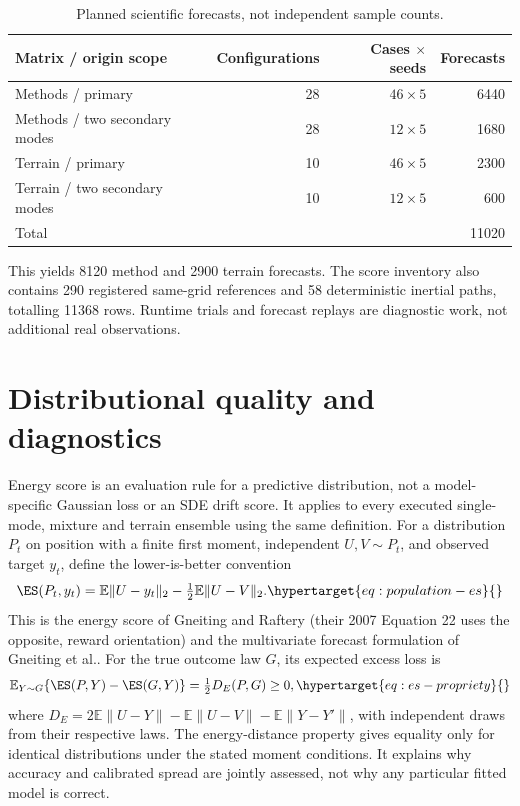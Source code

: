 \begin{table}[htbp]
\centering\small
\caption{Planned scientific forecasts, not independent sample counts.}
\label{tab:forecast-counts}\hypertarget{tab:forecast-counts}{}
\begin{tabular}{@{}lrrr@{}}
\toprule
Matrix / origin scope & Configurations & Cases $\times$ seeds & Forecasts\\
\midrule
Methods / primary & 28 & $46\times5$ & 6440\\
Methods / two secondary modes & 28 & $12\times5$ & 1680\\
Terrain / primary & 10 & $46\times5$ & 2300\\
Terrain / two secondary modes & 10 & $12\times5$ & 600\\
\midrule
Total & & & 11020\\
\bottomrule
\end{tabular}
\end{table}

This yields 8120 method and 2900 terrain forecasts. The score inventory also
contains 290 registered same-grid references and 58 deterministic inertial
paths, totalling 11368 rows. Runtime trials and forecast replays are diagnostic
work, not additional real observations.

\label{sec:inference}\hypertarget{sec:inference}{}

\section{Distributional quality and diagnostics}
Energy score is an evaluation rule for a predictive distribution, not a
model-specific Gaussian loss or an SDE drift score. It applies to every
executed single-mode, mixture and terrain ensemble using the same definition.
For a distribution \(P_t\) on position with a finite first moment,
independent \(U,V\sim P_t\), and observed target \(y_t\), define the
lower-is-better convention
\begin{equation}
 \ES(P_t,y_t)=\mathbb E\|U-y_t\|_2-\tfrac12\mathbb E\|U-V\|_2 .
 \label{eq:population-es}\hypertarget{eq:population-es}{}
\end{equation}
This is the energy score of Gneiting and Raftery (their 2007
Equation 22 uses the opposite, reward orientation) and the multivariate
forecast formulation of Gneiting et al.\cite{gneiting2007,gneiting2008}.
For the true outcome law \(G\), its expected excess loss is
\begin{equation}
 \mathbb E_{Y\sim G}\{\ES(P,Y)-\ES(G,Y)\}
 =\tfrac12 D_E(P,G)\geq0 ,
 \label{eq:es-propriety}\hypertarget{eq:es-propriety}{}
\end{equation}
where \(D_E=2\mathbb E\|U-Y\|-\mathbb E\|U-V\|-\mathbb E\|Y-Y'\|\),
with independent draws from their respective laws. The energy-distance
property gives equality only for identical distributions under the stated
moment conditions. It explains why accuracy and calibrated spread are
jointly assessed, not why any particular fitted model is correct.

